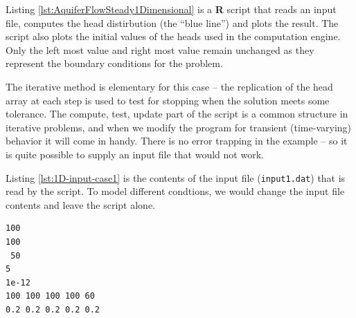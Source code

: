 Listing \ref{lst:AquiferFlowSteady1Dimensional} is a \textbf{R} script that reads an input file, computes the head distirbution (the ``blue line'') and plots the result.   The script also plots the initial values of the heads used in the computation engine.  Only the left most value and right most value remain unchanged as they represent the boundary conditions for the problem.

The iterative method is elementary for this case -- the replication of the head array at each step is used to test for stopping when the solution meets some tolerance.  The compute, test, update part of the script is a common structure in iterative problems, and when we modify the program for transient (time-varying) behavior it will come in handy.   There is no error trapping in the example -- so it is quite possible to supply an input file that would not work.  

Listing \ref{lst:1D-input-case1} is the contents of the input file (\texttt{input1.dat}) that is read by the script. 
To model different condtions, we would change the input file contents and leave the script alone.

\begin{lstlisting}[caption= Input File for Example Problem \\ This fragment of code contains ..., label=lst:1D-input-case1]
100
100
 50
5
1e-12
100 100 100 100 60
0.2 0.2 0.2 0.2 0.2
\end{lstlisting}

